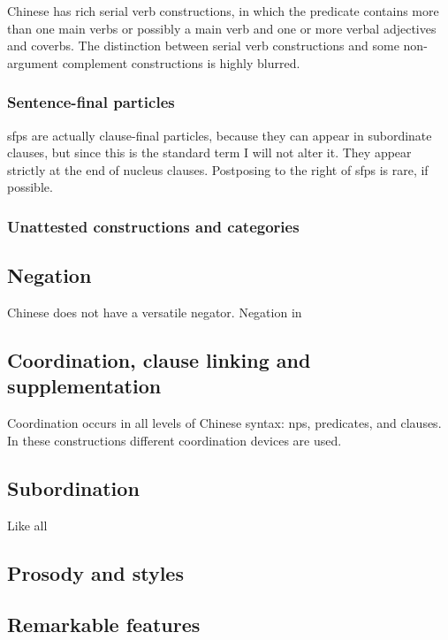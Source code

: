 \documentclass[UTF8, a4paper, oneside, scheme=plain]{ctexart}
\begin{document}
Chinese has rich serial verb constructions,
in which the predicate contains more than one main verbs
or possibly a main verb and one or more verbal adjectives and coverbs.
The distinction between serial verb constructions and some non-argument complement constructions 
is highly blurred.

\subsubsection{Sentence-final particles}

\ac{sfp}s are actually clause-final particles,
because they can appear in subordinate clauses,
but since this is the standard term I will not alter it.
They appear strictly at the end of nucleus clauses.
Postposing to the right of \ac{sfp}s is rare, if possible.

\subsubsection{Unattested constructions and categories}

\subsection{Negation}

Chinese does not have a versatile negator.
Negation in 

\subsection{Coordination, clause linking and supplementation}

Coordination occurs in all levels of Chinese syntax:
\ac{np}s, predicates, and clauses.
In these constructions different coordination devices are used.

\subsection{Subordination}

Like all 

\subsection{Prosody and styles}

\subsection{Remarkable features}
\end{document}

